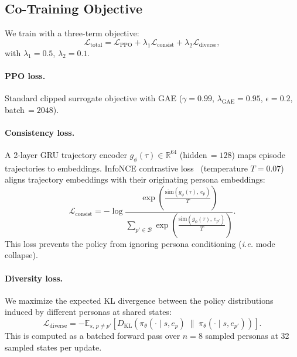 \documentclass{article}
\newcommand{\ie}{\textit{i.e.}\xspace}
\begin{document}
\subsection{Co-Training Objective}
\label{sec:objective}

We train with a three-term objective:
\begin{equation}
  \mathcal{L}_{\text{total}} = \mathcal{L}_{\text{PPO}}
  + \lambda_1 \mathcal{L}_{\text{consist}}
  + \lambda_2 \mathcal{L}_{\text{diverse}},
\end{equation}
with $\lambda_1\!=\!0.5$, $\lambda_2\!=\!0.1$.

\paragraph{PPO loss.}
Standard clipped surrogate objective with GAE ($\gamma\!=\!0.99$,
$\lambda_{\text{GAE}}\!=\!0.95$, $\epsilon\!=\!0.2$, batch\,$=\!2048$).

\paragraph{Consistency loss.}
A 2-layer GRU trajectory encoder $g_\phi(\tau) \in \mathbb{R}^{64}$
(hidden\,$=\!128$) maps episode trajectories to embeddings.
InfoNCE contrastive loss~\citep{oord2018cpc} (temperature $T\!=\!0.07$)
aligns trajectory embeddings with their originating persona embeddings:
\begin{equation}
  \mathcal{L}_{\text{consist}} = -\log
  \frac{\exp\!\left(\tfrac{\text{sim}(g_\phi(\tau),\, e_p)}{T}\right)}
       {\sum_{p' \in \mathcal{B}} \exp\!\left(\tfrac{\text{sim}(g_\phi(\tau),\, e_{p'})}{T}\right)}.
\end{equation}
This loss prevents the policy from ignoring persona conditioning
(\ie mode collapse).

\paragraph{Diversity loss.}
We maximize the expected KL divergence between the policy distributions
induced by different personas at shared states:
\begin{equation}
  \mathcal{L}_{\text{diverse}} = -\mathbb{E}_{s,\, p \neq p'}\!\left[
    D_{\mathrm{KL}}\!\left(\pi_\theta(\cdot \mid s, e_p)
    \;\|\; \pi_\theta(\cdot \mid s, e_{p'})\right)
  \right].
\end{equation}
This is computed as a batched forward pass over $n\!=\!8$ sampled personas at
32 sampled states per update.
\end{document}
